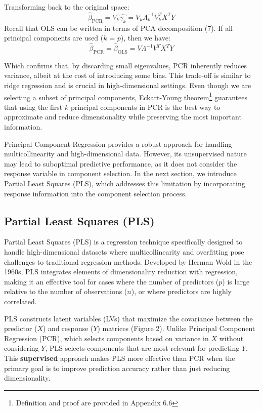 \documentclass[11pt,twoside,a4paper]{article}
\begin{document}
Transforming back to the original space:
\begin{equation}
\hat{\beta}_{\text{PCR}} = V_k \hat{\gamma_k} = V_k \Lambda_k^{-1} V_k^T X^T Y
\end{equation}
Recall that OLS can be written in terms of PCA decomposition (7). If all principal components are used (\( k \) = \( p \)), then we have:
\begin{equation}
\hat{\beta}_{\text{PCR}} = \hat{\beta}_{\text{OLS}} = V \Lambda^{-1} V^T X^T Y
\end{equation}

Which confirms that, by discarding small eigenvalues, PCR inherently reduces variance, albeit at the cost of introducing some bias. This trade-off is similar to ridge regression and is crucial in high-dimensional settings. Even though we are selecting a subset of principal components, Eckart-Young theorem\footnote{Definition and proof are provided in Appendix 6.6} guarantees that using the first \( k \) principal components in PCR is the best way to approximate and reduce dimensionality while preserving the most important information.

Principal Component Regression provides a robust approach for handling multicollinearity and high-dimensional data. However, its unsupervised nature may lead to suboptimal predictive performance, as it does not consider the response variable in component selection. In the next section, we introduce Partial Least Squares (PLS), which addresses this limitation by incorporating response information into the component selection process.

\subsection{Partial Least Squares (PLS)}

Partial Least Squares (PLS) is a regression technique specifically designed to handle high-dimensional datasets where multicollinearity and overfitting pose challenges to traditional regression methods. Developed by Herman Wold in the 1960s, PLS integrates elements of dimensionality reduction with regression, making it an effective tool for cases where the number of predictors (\( p \)) is large relative to the number of observations (\( n \)), or where predictors are highly correlated.

PLS constructs latent variables (LVs) that maximize the covariance between the predictor (\(X\)) and response (\(Y\)) matrices (Figure 2). Unlike Principal Component Regression (PCR), which selects components based on variance in \( X \) without considering \( Y \), PLS selects components that are most relevant for predicting \( Y \). This \textbf{supervised} approach makes PLS more effective than PCR when the primary goal is to improve prediction accuracy rather than just reducing dimensionality.
\end{document}
